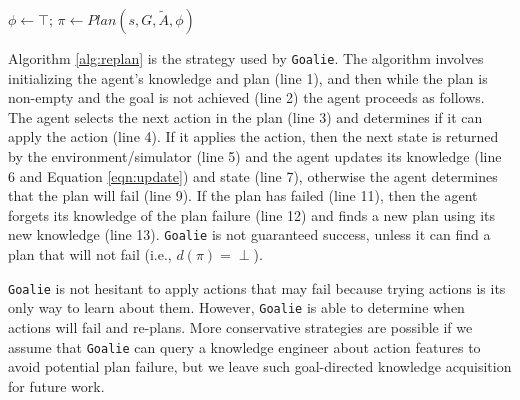 \documentclass[letterpaper]{article}
\def\goalie{{\tt Goalie}}
\begin{document}
\begin{algorithm}[t]
\SetLine
{}

 $\phi \leftarrow \top$; $\pi \leftarrow Plan(s, G, \tilde{A}, \phi)$\;
\While{$\pi \not= ()$ and $G\not\subseteq s$}{
 $a \leftarrow \pi.first()$;
 $\pi \leftarrow \pi.rest()$\;
\eIf{$\text{pre}(a) \subseteq s$ and $\phi \not\models \bigvee\limits_{\substack{\widetilde{\text{pre}}(\tilde{a},p) \in {\sf F}: p \not\in s} } \widetilde{\text{pre}}(\tilde{a},p)
$}{
	$s ' \leftarrow Execute(a)$\;
	 $\phi \leftarrow \phi \wedge o(s, a, s')$\;
	 $s \leftarrow s'$\;
}
{
	 $\phi \leftarrow \phi \wedge fail$\;
}

\If{$\phi \models fail$ }{
	 $\phi \leftarrow \exists_{fail}  \phi$\;
	 $\pi \leftarrow Plan(s, G, \tilde{A}, \phi)$\;
}
}
\caption{\goalie{}$(s, G, \tilde{A})$}\label{alg:replan}
\end{algorithm}

Algorithm \ref{alg:replan} is the strategy used by \goalie{}.  The algorithm
involves initializing the agent's knowledge and plan (line 1), and then while
the plan is non-empty and the goal is not achieved (line 2) the agent proceeds
as follows.  The agent selects the next action in the plan (line 3) and
determines if it can apply the action (line 4).  If it applies the action, then
the next state is returned by the environment/simulator (line 5) and the agent
updates its knowledge (line 6 and Equation \ref{eqn:update}) and state (line 7),
otherwise the agent determines that the plan will fail (line 9).  If the plan
has failed (line 11), then the agent forgets its knowledge of the plan failure
(line 12) and finds a new plan using its new knowledge (line 13). \goalie{} is
not guaranteed success, unless it can find a plan that will not fail (i.e., 
$d(\pi) = \perp$).

\goalie{} is not hesitant to apply actions that may fail because trying actions
is its only way to learn about them.  However, \goalie{} is able to determine
when actions will fail and re-plans.  More conservative strategies are possible
if we assume that \goalie{} can query a knowledge engineer about action features
to avoid potential plan failure, but we leave such goal-directed knowledge
acquisition for future work.
\end{document}
